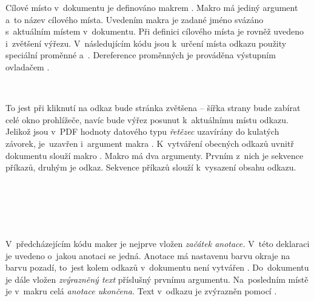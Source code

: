 \documentclass[12pt]{article}
\begin{document}
\medskip
Cílové místo v~dokumentu je definováno makrem . Makro má
jediný argument a~to název cílového místa. 
Uvedením makra je zadané jméno svázáno s~aktuálním místem v~dokumentu.
Při definici cílového místa je rovněž
uvedeno i~zvětšení výřezu. V~následujícím kódu jsou k~určení místa
odkazu použity speciální proměnné  a~. 
Dereference proměnných je prováděna výstupním ovladačem .
\begin{flushleft}
   \\
\end{flushleft}
To jest při kliknutí na odkaz bude stránka zvětšena -- šířka strany bude
zabírat celé okno prohlížeče, 
navíc bude výřez posunut k~aktuálnímu místu odkazu.
Jelikož jsou v~PDF hodnoty datového typu \emph{řetězec}
uzavírány do kulatých závorek,
je~uzavřen i~argument  makra .
K~vytváření obecných odkazů uvnitř dokumentu slouží makro .
Makro má dva argumenty. Prvním z~nich je sekvence příkazů, druhým je odkaz.
Sekvence příkazů slouží k~vysazení obsahu odkazu.
\begin{flushleft}
   \\
   \\
   \\
   \\
\end{flushleft}
V~předcházejícím kódu maker je nejprve vložen \emph{začátek anotace.} V~této
deklaraci je uvedeno o~jakou anotaci se jedná. Anotace má nastavenu barvu
okraje na barvu pozadí, to~jest kolem odkazů v~dokumentu není vytvářen
. Do~dokumentu je dále vložen \emph{zvýrazněný text}
příslušný prvnímu argumentu. 
Na~posledním místě je v~makru celá \emph{anotace ukončena.}
Text v~odkazu je zvýrazněn pomocí .
\end{document}
